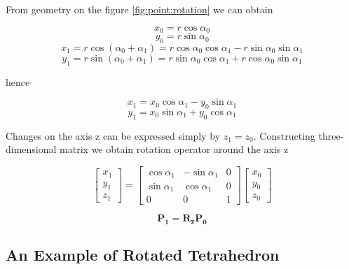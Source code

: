 From geometry on the figure \ref{fig:point:rotation} we can obtain

\begin{equation}
x_0 = r \cos \alpha_0
\end{equation}
\begin{equation}
y_0 = r \sin \alpha_0
\end{equation}
\begin{equation}
x_1 = r \cos (\alpha_0 + \alpha_1) = r \cos \alpha_0 \cos \alpha_1 - r \sin \alpha_0 \sin \alpha_1
\end{equation}
\begin{equation}
y_1 = r \sin (\alpha_0 + \alpha_1) = r \sin \alpha_0 \cos \alpha_1 + r \cos \alpha_0 \sin \alpha_1
\end{equation}

hence

\begin{equation}
x_1 = x_0 \cos \alpha_1 - y_0 \sin \alpha_1
\end{equation}
\begin{equation}
y_1 = x_0 \sin \alpha_1 + y_0 \cos \alpha_1
\end{equation}

Changes on the axis z can be expressed simply by $z_1 = z_0$. Constructing three-dimensional matrix we obtain rotation operator around the axis z

\begin{equation}
\begin{bmatrix}
	x_1 \\
	y_1 \\
	z_1
\end{bmatrix}
=
\begin{bmatrix}
	\cos \alpha_1 & - \sin \alpha_1 & 0 \\
	\sin \alpha_1 & \cos \alpha_1 & 0 \\
	0 & 0 & 1
\end{bmatrix}
\begin{bmatrix}
	x_0 \\
	y_0 \\
	z_0
\end{bmatrix}
\end{equation}

\begin{equation}
\mathbf{P_1} = \mathbf{R_z P_0}
\end{equation}

\subsection{An Example of Rotated Tetrahedron}

